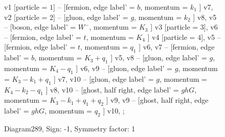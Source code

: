 \documentclass{revtex4}
\begin{document}
\begin{figure}[!htb]
\begin{center}
{    %
v1 [particle = \(1\)] -- [fermion, edge label' = \(b\), momentum = \(k_{1}\) ] v7, 
v2 [particle = \(2\)] -- [gluon, edge label' = \(g\), momentum = \(k_{2}\) ] v8, 
v5 -- [boson, edge label' = \(W^{-}\), momentum = \(K_{3}\) ] v3 [particle = \(3\)], 
v6 -- [fermion, edge label' = \(t\), momentum = \(K_{4}\) ] v4 [particle = \(4\)], 
v5 -- [fermion, edge label' = \(t\), momentum = \(q_{1}\) ] v6, 
v7 -- [fermion, edge label' = \(b\), momentum = \(K_{3} + q_{1}\) ] v5, 
v8 -- [gluon, edge label' = \(g\), momentum = \(K_{4} - q_{1}\) ] v6, 
v9 -- [gluon, edge label' = \(g\), momentum = \(K_{3} - k_{1} + q_{1}\) ] v7, 
v10 -- [gluon, edge label' = \(g\), momentum = \(K_{4} - k_{2} - q_{1}\) ] v8, 
v10 -- [ghost, half right, edge label' = \(ghG\), momentum = \(K_{3} - k_{1} + q_{1} + q_{2}\) ] v9, 
v9 -- [ghost, half right, edge label' = \(ghG\), momentum = \(q_{2}\) ] v10, 
};
\end{center}
\caption{Diagram289, Sign: -1, Symmetry factor: 1}
\end{figure}
\newpage
\end{document}
